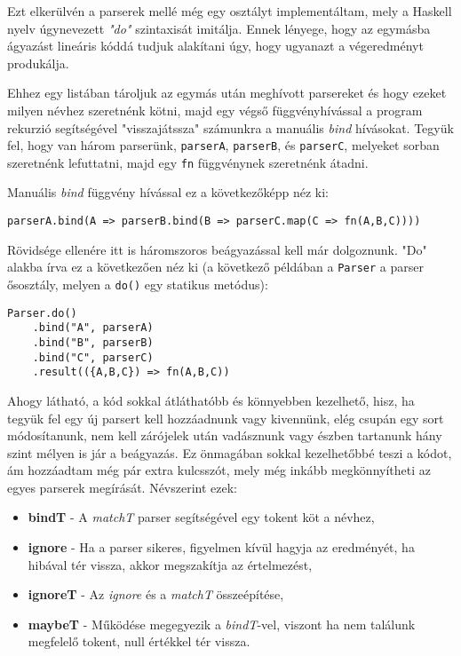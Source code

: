 Ezt elkerülvén a parserek mellé még egy osztályt implementáltam, mely a Haskell nyelv úgynevezett \textit{"do"} szintaxisát imitálja. Ennek lényege, hogy az egymásba ágyazást lineáris kóddá tudjuk alakítani úgy, hogy ugyanazt a végeredményt produkálja.

Ehhez egy listában tároljuk az egymás után meghívott parsereket és hogy ezeket milyen névhez szeretnénk kötni, majd egy végső függvényhívással a program rekurzió segítségével "visszajátssza" számunkra a manuális \textit{bind} hívásokat. Tegyük fel, hogy van három parserünk, \texttt{parserA}, \texttt{parserB}, és \texttt{parserC}, melyeket sorban szeretnénk lefuttatni, majd egy \texttt{fn} függvénynek szeretnénk átadni.

Manuális \textit{bind} függvény hívással ez a következőképp néz ki:

\begin{verbatim}
parserA.bind(A => parserB.bind(B => parserC.map(C => fn(A,B,C))))
\end{verbatim}

Rövidsége ellenére itt is háromszoros beágyazással kell már dolgoznunk. "Do" alakba írva ez a következően néz ki (a következő példában a \texttt{Parser} a parser ősosztály, melyen a \texttt{do()} egy statikus metódus):

\begin{verbatim}
Parser.do()
    .bind("A", parserA)
    .bind("B", parserB)
    .bind("C", parserC)
    .result(({A,B,C}) => fn(A,B,C))
\end{verbatim}

Ahogy látható, a kód sokkal átláthatóbb és könnyebben kezelhető, hisz, ha tegyük fel egy új parsert kell hozzáadnunk vagy kivennünk, elég csupán egy sort módosítanunk, nem kell zárójelek után vadásznunk vagy észben tartanunk hány szint mélyen is jár a beágyazás. Ez önmagában sokkal kezelhetőbbé teszi a kódot, ám hozzáadtam még pár extra kulcsszót, mely még inkább megkönnyítheti az egyes parserek megírását. Névszerint ezek:

\begin{itemize}
    \item \textbf{bindT} - A \textit{matchT} parser segítségével egy tokent köt a névhez,
    \item \textbf{ignore} - Ha a parser sikeres, figyelmen kívül hagyja az eredményét, ha hibával tér vissza, akkor megszakítja az értelmezést,
    \item \textbf{ignoreT} - Az \textit{ignore} és a \textit{matchT} összeépítése,
    \item \textbf{maybeT} - Működése megegyezik a \textit{bindT}-vel, viszont ha nem találunk megfelelő tokent, null értékkel tér vissza.
\end{itemize}

